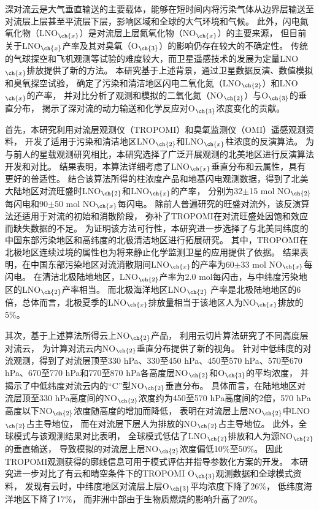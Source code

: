 
\abstract
{
深对流云是大气垂直输送的主要载体，能够在短时间内将污染气体从边界层输送至对流层上层甚至平流层下层，影响区域和全球的大气环境和气候。
此外，闪电氮氧化物（LNO$_{\ch{x}}$）是对流层上层氮氧化物（NO$_{\ch{x}}$）的主要来源，
但目前关于LNO$_{\ch{x}}$产率及其对臭氧（O$_{\ch{3}}$）的影响仍存在较大的不确定性。
传统的气球探空和飞机观测等试验的难度较大，而卫星遥感技术的发展为定量LNO$_{\ch{x}}$排放提供了新的方法。
本研究基于上述背景，通过卫星数据反演、数值模拟和臭氧探空试验，
确定了污染和清洁地区闪电二氧化氮（LNO$_{\ch{2}}$）和LNO$_{\ch{x}}$的产率，
并对比分析了观测和模拟的二氧化氮（NO$_{\ch{2}}$）与O$_{\ch{3}}$的垂直分布，
揭示了深对流的动力输送和化学反应对O$_{\ch{3}}$浓度变化的贡献。

首先，本研究利用对流层观测仪（TROPOMI）和臭氧监测仪（OMI）遥感观测资料，
开发了适用于污染和清洁地区LNO$_{\ch{2}}$和LNO$_{\ch{x}}$柱浓度的反演算法。
为与前人的星载观测研究相比，本研究选择了广泛开展观测的北美地区进行反演算法开发和对比。
结果表明，本算法详细考虑了LNO$_{\ch{x}}$垂直分布和云属性，具有更好的普适性。
结合该算法所得的柱浓度产品和地基闪电观测数据，得到了北美大陆地区对流旺盛时LNO$_{\ch{2}}$和LNO$_{\ch{x}}$的产率，
分别为32$\pm$15 mol NO$_{\ch{2}}$每闪电和90$\pm$50 mol NO$_{\ch{x}}$每闪电。
除前人普遍研究的旺盛对流外，该反演算法还适用于对流的初始和消散阶段，
弥补了TROPOMI在对流旺盛处因饱和效应而缺失数据的不足。
为证明该方法可行性，本研究进一步选择了与北美同纬度的中国东部污染地区和高纬度的北极清洁地区进行拓展研究。
其中，TROPOMI在北极地区连续过境的属性也为将来静止化学监测卫星的应用提供了依据。
结果表明，在中国东部污染地区对流消散期间LNO$_{\ch{x}}$的产率为60$\pm$33 mol NO$_{\ch{x}}$每闪电。
在清洁北极陆地地区，LNO$_{\ch{2}}$产率为2.0 mol每闪击，与中纬度污染地区的LNO$_{\ch{2}}$产率相当。
而北极海洋地区LNO$_{\ch{2}}$ 产率是北极陆地地区的6倍，总体而言，北极夏季的LNO$_{\ch{x}}$排放量相当于该地区人为NO$_{\ch{x}}$排放的5\%。

其次，基于上述算法所得云上NO$_{\ch{2}}$产品，
利用云切片算法研究了不同高度层对流云，
为计算对流云内NO$_{\ch{2}}$垂直分布提供了新的视角。
针对中低纬度的对流观测，得到了对流层顶至330 hPa、330至450 hPa、450至570 hPa、570至670 hPa、670至770 hPa和770至870 hPa各高度层NO$_{\ch{2}}$和O$_{\ch{3}}$的平均浓度，
并揭示了中低纬度对流云内的“C”型NO$_{\ch{2}}$垂直分布。
具体而言，在陆地地区对流层顶至330 hPa高度间的NO$_{\ch{2}}$浓度约为450至570 hPa高度间的2倍，570 hPa高度以下NO$_{\ch{2}}$浓度随高度的增加而降低，
表明在对流层上层NO$_{\ch{2}}$中LNO$_{\ch{2}}$占主导地位，
而在对流层下层人为排放的NO$_{\ch{2}}$占主导地位。
此外，全球模式与该观测结果对比表明，
全球模式低估了LNO$_{\ch{2}}$排放和人为源NO$_{\ch{2}}$的垂直输送，
导致模拟的对流层上层NO$_{\ch{2}}$浓度偏低10\%至50\%。
因此TROPOMI观测获得的廓线信息可用于模式评估并指导参数化方案的开发。
本研究进一步对比了有云和晴空条件下的TROPOMI O$_{\ch{3}}$观测数据和全球模式资料，
发现有云时，中纬度地区对流层上层O$_{\ch{3}}$平均浓度下降了26\%，
低纬度海洋地区下降了17\%，
而非洲中部由于生物质燃烧的影响升高了20\%。

}
